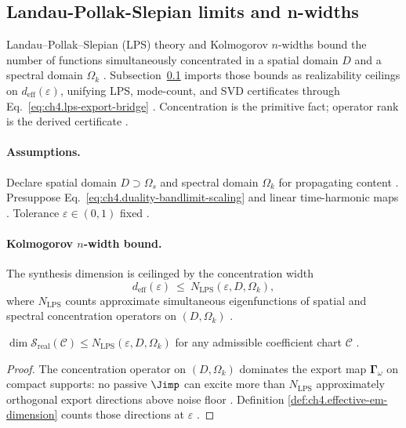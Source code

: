﻿\subsection{Landau-Pollak-Slepian limits and n-widths}
\label{sec:ch484}

Landau--Pollak--Slepian (LPS) theory and Kolmogorov \(n\)-widths bound the number of functions simultaneously concentrated in a spatial domain
\(D\) and a spectral domain \(\Omega_{k}\) \cite{hansen1988,stratton1941}. Subsection~\ref{sec:ch484} imports those bounds as realizability ceilings
on \(d_{\mathrm{eff}}(\varepsilon)\), unifying LPS, mode-count, and SVD certificates through Eq.~\eqref{eq:ch4.lps-export-bridge}
\cite{harrington2001,devaney2004,jackson1999}. Concentration is the primitive fact; operator rank is the derived certificate
\cite{stratton1941,hansen1988}.

\paragraph{Assumptions.}
Declare spatial domain \(D\supset\Omega_{s}\) and spectral domain \(\Omega_{k}\) for propagating content \cite{stratton1941,jackson1999,hansen1988}.
Presuppose Eq.~\eqref{eq:ch4.duality-bandlimit-scaling} and linear time-harmonic maps \cite{harrington2001,devaney2004}. Tolerance \(\varepsilon\in(0,1)\)
fixed \cite{hansen1988}.

\paragraph{Kolmogorov \(n\)-width bound.}
The synthesis dimension is ceilinged by the concentration width
\begin{equation}
\label{eq:ch4.lps-nwidth-bound}
d_{\mathrm{eff}}(\varepsilon)\ \le\ N_{\mathrm{LPS}}(\varepsilon,D,\Omega_{k}),
\end{equation}
where \(N_{\mathrm{LPS}}\) counts approximate simultaneous eigenfunctions of spatial and spectral concentration operators on \((D,\Omega_{k})\)
\cite{harrington2001,devaney2004,jackson1999,hansen1988}.

\begin{theorem}
\label{thm:ch4.lps-synthesis-bound}
\(\dim\mathcal{S}_{\mathrm{real}}(\mathcal{C})\le N_{\mathrm{LPS}}(\varepsilon,D,\Omega_{k})\) for any admissible coefficient chart \(\mathcal{C}\)
\cite{stratton1941,hansen1988,harrington2001,devaney2004}.
\end{theorem}
\begin{proof}
The concentration operator on \((D,\Omega_{k})\) dominates the export map \(\boldsymbol{\Gamma}_\omega\) on compact supports: no passive
\(\Jimp\) can excite more than \(N_{\mathrm{LPS}}\) approximately orthogonal export directions above noise floor \cite{hansen1988}. Definition
\ref{def:ch4.effective-em-dimension} counts those directions at \(\varepsilon\) \cite{harrington2001,stratton1941}.
\end{proof}


